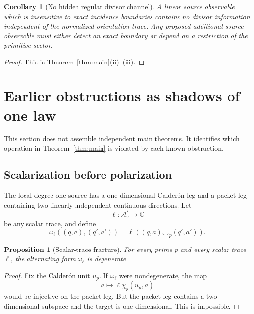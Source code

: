 \documentclass[11pt]{article}
\newtheorem{proposition}[theorem]{Proposition}
\newtheorem{corollary}[theorem]{Corollary}
\theoremstyle{definition}
\theoremstyle{remark}
\newcommand{\C}{\mathbb C}
\newcommand{\cA}{\mathcal A}
\begin{document}
\begin{corollary}[No hidden regular divisor channel]
\label{cor:no-third-channel}
A linear source observable which is insensitive to exact incidence
boundaries contains no divisor information independent of the normalized
orientation trace.  Any proposed additional source observable must either
detect an exact boundary or depend on a restriction of the primitive
sector.
\end{corollary}

\begin{proof}
This is Theorem~\ref{thm:main}(ii)--(iii).
\end{proof}

\section{Earlier obstructions as shadows of one law}
\label{sec:shadows}

This section does not assemble independent main theorems.  It identifies
which operation in Theorem~\ref{thm:main} is violated by each known
obstruction.

\subsection{Scalarization before polarization}

The local degree-one source has a one-dimensional Calder\'on leg and a
packet leg containing two linearly independent continuous directions.
Let
\[
                    \ell:\cA_p^2\longrightarrow\C
\tag{6.1}\label{eq:scalar-trace}
\]
be any scalar trace, and define
\[
 \omega_\ell((q,a),(q',a'))
     =\ell\!\left((q,a)\smile_p(q',a')\right).
\tag{6.2}\label{eq:scalar-cup}
\]

\begin{proposition}[Scalar-trace fracture]
\label{prop:scalar-fracture}
For every prime \(p\) and every scalar trace \(\ell\), the alternating form
\(\omega_\ell\) is degenerate.
\end{proposition}

\begin{proof}
Fix the Calder\'on unit \(u_p\).  If \(\omega_\ell\) were nondegenerate,
the map
\[
  a\longmapsto \ell\chi_p(u_p,a)
\tag{6.3}\label{eq:packet-scalar-map}
\]
would be injective on the packet leg.  But the packet leg contains a
two-dimensional subspace and the target is one-dimensional.  This is
impossible.
\end{proof}
\end{document}
